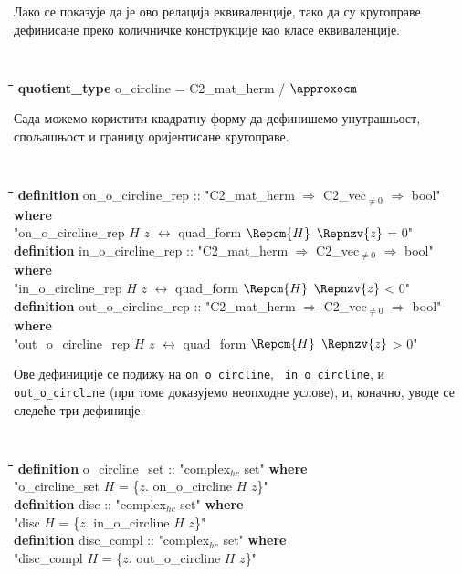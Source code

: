 Лако се показује да је ово релација еквиваленције, тако да су
кругоправе дефинисане преко количничке конструкције као класе
еквиваленције.

{\tt
\begin{tabbing}
\hspace{5mm}\=\hspace{5mm}\=\hspace{5mm}\=\hspace{5mm}\=\hspace{5mm}\=\kill
{\bf quotient\_type} o\_circline = C2\_mat\_herm / $\approxocm$
\end{tabbing}
}

Сада можемо користити квадратну форму да дефинишемо унутрашњост,
спољашњост и границу оријентисане кругоправе.

{\tt
\begin{tabbing}
\hspace{5mm}\=\hspace{5mm}\=\hspace{5mm}\=\hspace{5mm}\=\hspace{5mm}\=\kill
{\bf definition} on\_o\_circline\_rep :: "C2\_mat\_herm $\Rightarrow$ C2\_vec$_{\neq 0}$ $\Rightarrow$ bool" {\bf where}\\
\>"on\_o\_circline\_rep $H$ $z$ $\longleftrightarrow$ quad\_form $\Repcm{H}$ $\Repnzv{z}$ = 0"\\
{\bf definition} in\_o\_circline\_rep :: "C2\_mat\_herm $\Rightarrow$ C2\_vec$_{\neq 0}$ $\Rightarrow$ bool" {\bf where}\\
\>"in\_o\_circline\_rep $H$ $z$ $\longleftrightarrow$ quad\_form $\Repcm{H}$ $\Repnzv{z}$ < 0"\\
{\bf definition} out\_o\_circline\_rep :: "C2\_mat\_herm $\Rightarrow$ C2\_vec$_{\neq 0}$ $\Rightarrow$ bool" {\bf where}\\
\>"out\_o\_circline\_rep $H$ $z$ $\longleftrightarrow$ quad\_form $\Repcm{H}$ $\Repnzv{z}$ > 0"
\end{tabbing}
}

\noindent Ове дефиниције се подижу на {\tt on\_o\_circline}, {\tt
  in\_o\_circline}, и {\tt out\_o\_circline} (при томе доказујемо
неопходне услове), и, коначно, уводе се следеће три дефиницје.

{\tt
\begin{tabbing}
\hspace{5mm}\=\hspace{5mm}\=\hspace{5mm}\=\hspace{5mm}\=\hspace{5mm}\=\kill
{\bf definition} o\_circline\_set :: "complex$_{hc}$ set" {\bf where} \\
\>"o\_circline\_set $H$ = \{$z$. on\_o\_circline $H$ $z$\}"\\
{\bf definition} disc :: "complex$_{hc}$ set" {\bf where} \\
\>"disc $H$ = \{$z$. in\_o\_circline $H$ $z$\}"\\
{\bf definition} disc\_compl :: "complex$_{hc}$ set" {\bf where} \\
\>"disc\_compl $H$ = \{$z$. out\_o\_circline $H$ $z$\}"
\end{tabbing}
}

